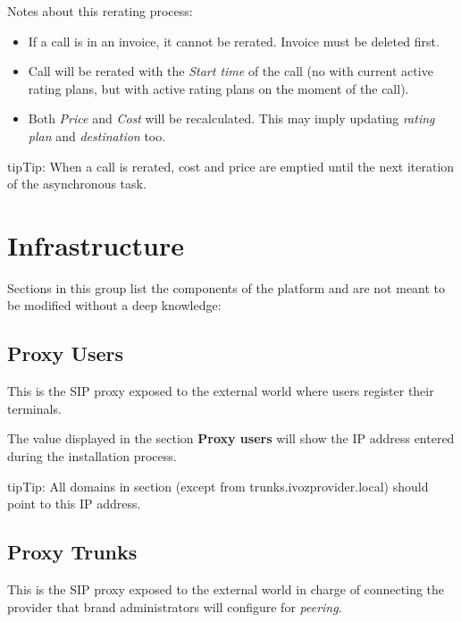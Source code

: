 \documentclass[letterpaper,10pt,english]{sphinxmanual}
\begin{document}
Notes about this rerating process:
\begin{itemize}
\item {} 
If a call is in an invoice, it cannot be rerated. Invoice must be deleted first.

\item {} 
Call will be rerated with the \emph{Start time} of the call (no with current active rating plans, but with active rating plans
on the moment of the call).

\item {} 
Both \emph{Price} and \emph{Cost} will be recalculated. This may imply updating \emph{rating plan} and \emph{destination} too.

\end{itemize}

\begin{notice}{tip}{Tip:}
When a call is rerated, cost and price are emptied until the next iteration of the asynchronous task.
\end{notice}


\section{Infrastructure}
\label{administration_portal/platform/infrastructure/index:infrastructure}\label{administration_portal/platform/infrastructure/index::doc}
Sections in this group list the components of the platform and are not meant to be modified without a deep knowledge:


\subsection{Proxy Users}
\label{administration_portal/platform/infrastructure/proxy_users:proxy-users}\label{administration_portal/platform/infrastructure/proxy_users:proxyusers}\label{administration_portal/platform/infrastructure/proxy_users::doc}
This is the SIP proxy exposed to the external world where users register their
terminals.

The value displayed in the section \textbf{Proxy users} will show the IP address
entered during the installation process.

\begin{notice}{tip}{Tip:}
All domains in  section (except from trunks.ivozprovider.local) should point to this IP address.
\end{notice}


\subsection{Proxy Trunks}
\label{administration_portal/platform/infrastructure/proxy_trunks:proxy-trunks}\label{administration_portal/platform/infrastructure/proxy_trunks::doc}
This is the SIP proxy exposed to the external world in charge of connecting
the provider that brand administrators will configure for \emph{peering}.
\end{document}
